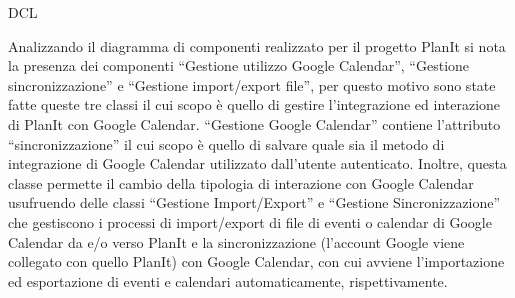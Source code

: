 \begin{listaPersonale}{DCL}
\begin{listaPersonale2}[DCL]{}
        Analizzando il diagramma di componenti realizzato per il progetto PlanIt si nota la presenza dei componenti “Gestione utilizzo Google Calendar”, “Gestione sincronizzazione” e “Gestione import/export file”, per questo motivo sono state fatte queste tre classi il cui scopo è quello di gestire l'integrazione ed interazione di PlanIt con Google Calendar. “Gestione Google Calendar” contiene l'attributo “sincronizzazione” il cui scopo è quello di salvare quale sia il metodo di integrazione di Google Calendar utilizzato dall'utente autenticato. Inoltre, questa classe permette il cambio della tipologia di interazione con Google Calendar usufruendo delle classi “Gestione Import/Export” e “Gestione Sincronizzazione” che gestiscono i processi di import/export di file di eventi o calendar di Google Calendar da e/o verso PlanIt e la sincronizzazione (l'account Google viene collegato con quello PlanIt) con Google Calendar, con cui avviene l'importazione ed esportazione di eventi e calendari automaticamente, rispettivamente.
        \begin{comment}
            \begin{center}
                \\
                \blfootnote{Immagine \href{https://github.com/Life-planner/Documentazione/blob/main/D3/img/Diagrammi/png/path/to/img.png}{PNG}/\href{https://github.com/Life-planner/Documentazione/blob/main/D3/img/Diagrammi/svg/path/to/img.svg}{SVG} nome file}
            \end{center}
        \end{comment}



\end{listaPersonale2}
\end{listaPersonale}
